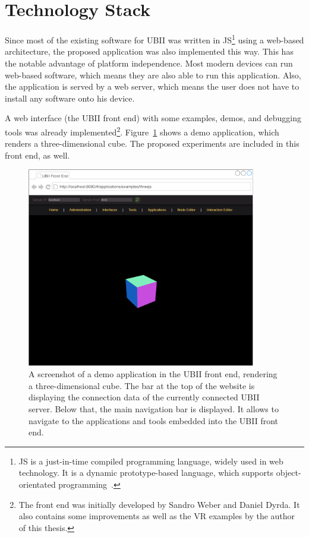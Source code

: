 \section{Technology Stack}\label{section:technology-stack}

Since most of the existing software for \gls{UBII} was written in \gls{JS}\footnote{\gls{JS} is a just-in-time compiled programming language, widely used in web technology. It is a dynamic prototype-based language, which supports object-orientated programming~\cite[43, 47]{ECMAInternational.2018}.} using a web-based architecture, the proposed application was also implemented this way. This has the notable advantage of platform independence. Most modern devices can run web-based software, which means they are also able to run this application. Also, the application is served by a web server, which means the user does not have to install any software onto his device.

A web interface (the \gls{UBII} front end) with some examples, demos, and debugging tools was already implemented\footnote{The front end was initially developed by Sandro Weber and Daniel Dyrda. It also contains some improvements as well as the \gls{VR} examples by the author of this thesis.}. Figure~\ref{fig:ubii-front-end} shows a demo application, which renders a three-dimensional cube. The proposed experiments are included in this front end, as well.

\begin{figure}[H]
	\centering
	\includegraphics[width=10cm]{figures/implementation/ubii_front_end.pdf}
	\caption[Screenshot of the front end]{A screenshot of a demo application in the UBII front end, rendering a three-dimensional cube. The bar at the top of the website is displaying the connection data of the currently connected \gls{UBII} server. Below that, the main navigation bar is displayed. It allows to navigate to the applications and tools embedded into the \gls{UBII} front end.}\label{fig:ubii-front-end}
\end{figure}

